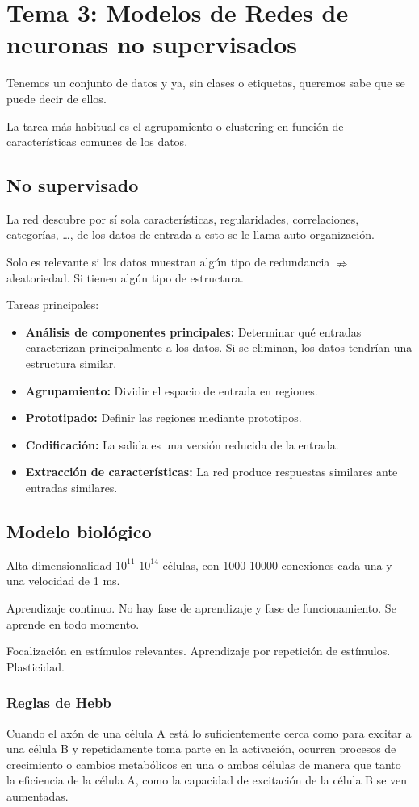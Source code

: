 \documentclass[12pt, twoside, openright]{report} %
\begin{document}
\chapter{Tema 3: Modelos de Redes de neuronas no supervisados}
Tenemos un conjunto de datos y ya, sin clases o etiquetas, queremos sabe que se puede decir de ellos.

La tarea más habitual es el agrupamiento o clustering en función de características comunes de los datos.
\section{No supervisado}
La red descubre por sí sola características, regularidades, correlaciones, categorías, …, de los datos de entrada a esto se le llama auto-organización. 

Solo es relevante si los datos muestran algún tipo de redundancia $\nRightarrow$ aleatoriedad. Si tienen algún tipo de estructura.

Tareas principales:
\begin{itemize}
	\item \textbf{Análisis de componentes principales:} Determinar qué entradas caracterizan principalmente a los datos. Si se eliminan, los datos tendrían una estructura similar.
	\item \textbf{Agrupamiento:} Dividir el espacio de entrada en regiones.
	\item \textbf{Prototipado:} Definir las regiones mediante prototipos.
	\item \textbf{Codificación:} La salida es una versión reducida de la entrada.
	\item \textbf{Extracción de características:} La red produce respuestas similares ante entradas similares.
\end{itemize}

\section{Modelo biológico}
Alta dimensionalidad $10^{11}$-$10^{14}$ células, con 1000-10000 conexiones cada una y una velocidad de 1 ms.

Aprendizaje continuo. No hay fase de aprendizaje y fase de funcionamiento. Se aprende en todo momento.

Focalización en estímulos relevantes. Aprendizaje por repetición de estímulos. Plasticidad.

\subsection{Reglas de Hebb}
Cuando el axón de una célula A está lo suficientemente cerca como para excitar a una célula B y repetidamente toma parte en la activación, ocurren procesos de crecimiento o cambios metabólicos en una o ambas células de manera que tanto la eficiencia de la célula A, como la capacidad de excitación de la célula B se ven aumentadas.
\end{document}
